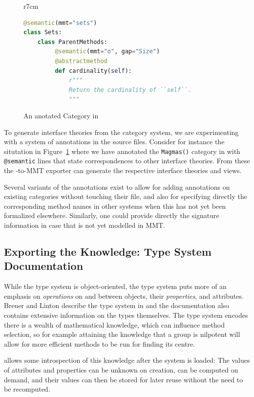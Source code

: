 \begin{figure}r{7cm}\vspace*{-2.5em}
\begin{lstlisting}[language=Python]
@semantic(mmt="sets")
class Sets:
    class ParentMethods:
         @semantic(mmt="o", gap="Size")
         @abstractmethod
         def cardinality(self):
             r"""
             Return the cardinality of ``self``.
             """
\end{lstlisting}
\vspace*{-.5em}
\caption{An anotated Category in \Sage}\label{fig:anncat}\vspace*{-1.5em}
\end{figure}
To generate interface theories from the \Sage category system, we are experimenting with a
system of annotations in the \Sage source files. Consider for instance the situtation in
Figure~\ref{fig:anncat} where we have annotated the \texttt{Magmas()} category in \Sage
with \texttt{@semantic} lines that state correspondences to other interface theories. From
these the \Sage-to-MMT exporter can generate the respective interface theories and views.

Several variants of the annotations exist to allow for adding annotations on existing
categories without touching their file, and also for specifying directly the corresponding
method names in other systems when this has not yet been formalized elsewhere. Similarly,
one could provide directly the signature information in case that is not yet modelled in
MMT.

\subsection{Exporting the \GAP Knowledge: Type System Documentation}

While the \Sage type system is object-oriented, the \GAP type system puts more of an
emphasis on \emph{operations} on and between objects, their \emph{properties}, and
attributes. Breuer and Linton describe the \GAP type system in \cite{breuer-linton} and
the \GAP documentation \cite{GAP4} also contains extensive information on the types
themselves. The \GAP type system encodes \GAP there is a wealth of mathematical knowledge,
which can influence method selection, so for example attaining the knowledge that a group
is nilpotent will allow for more efficient methods to be run for finding its centre.

\GAP allows some introspection of this knowledge after the system is loaded: The values of
attributes and properties can be unknown on creation, can be computed on demand, and their
values can then be stored for later reuse without the need to be recomputed.

